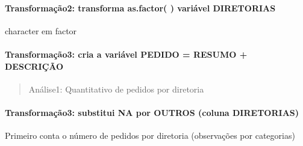 \documentclass[]{article}
\newenvironment{Shaded}{\begin{snugshade}}{\end{snugshade}}
\newcommand{\DataTypeTok}[1]{\textcolor[rgb]{0.13,0.29,0.53}{#1}}
\newcommand{\KeywordTok}[1]{\textcolor[rgb]{0.13,0.29,0.53}{\textbf{#1}}}
\newcommand{\NormalTok}[1]{#1}
\newcommand{\OperatorTok}[1]{\textcolor[rgb]{0.81,0.36,0.00}{\textbf{#1}}}
\newcommand{\OtherTok}[1]{\textcolor[rgb]{0.56,0.35,0.01}{#1}}
\newcommand{\StringTok}[1]{\textcolor[rgb]{0.31,0.60,0.02}{#1}}
\let\oldparagraph\paragraph
\renewcommand{\paragraph}[1]{\oldparagraph{#1}\mbox{}}
\begin{document}
\hypertarget{transformacao2-transforma-as.factor-variavel-diretorias}{%
\paragraph{Transformação2: transforma as.factor( ) variável
DIRETORIAS}\label{transformacao2-transforma-as.factor-variavel-diretorias}}

character em factor

\hypertarget{transformacao3-cria-a-variavel-pedido-resumo-descricao}{%
\paragraph{Transformação3: cria a variável PEDIDO = RESUMO +
DESCRIÇÃO}\label{transformacao3-cria-a-variavel-pedido-resumo-descricao}}

\begin{Shaded}
\end{Shaded}

\begin{quote}
Análise1: Quantitativo de pedidos por diretoria
\end{quote}

\hypertarget{transformacao3-substitui-na-por-outros-coluna-diretorias}{%
\paragraph{Transformação3: substitui NA por OUTROS (coluna
DIRETORIAS)}\label{transformacao3-substitui-na-por-outros-coluna-diretorias}}

Primeiro conta o número de pedidos por diretoria (observações por
categorias)

\begin{Shaded}
\end{Shaded}
\end{document}
